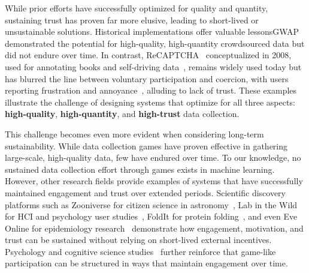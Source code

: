 While prior efforts have successfully optimized for quality and quantity, sustaining trust has proven far more elusive, leading to short-lived or unsustainable solutions. Historical implementations offer valuable lessons\textemdash{}GWAP demonstrated the potential for high-quality, high-quantity crowdsourced data but did not endure over time. In contrast, ReCAPTCHA~\cite{von2008recaptcha} conceptualized in 2008, used for annotating books and self-driving data~\cite{captcha_google,captcha_nyt}, remains widely used today but has blurred the line between voluntary participation and coercion, with users reporting frustration and annoyance~\cite{searles2023empirical,searles2023dazed}, alluding to lack of trust. These examples illustrate the challenge of designing systems that optimize for all three aspects: \textbf{high-quality}, \textbf{high-quantity}, and \textbf{high-trust} data collection.


This challenge becomes even more evident when considering long-term sustainability. While data collection games have proven effective in gathering large-scale, high-quality data, few have endured over time. To our knowledge, no sustained data collection effort through games exists in machine learning. However, other research fields provide examples of systems that have successfully maintained engagement and trust over extended periods. Scientific discovery platforms such as Zooniverse for citizen science in astronomy~\cite{cardamone2009galaxy,lintott2008galaxy}, Lab in the Wild for HCI and psychology user studies~\cite{reinecke2015labinthewild}, FoldIt for protein folding~\cite{khatib2011crystal,cooper2010predicting}, and even Eve Online for epidemiology research~\cite{kafai2016connected} demonstrate how engagement, motivation, and trust can be sustained without relying on short-lived external incentives. Psychology and cognitive science studies~\cite{allen2024using} further reinforce that game-like participation can be structured in ways that maintain engagement over time.

